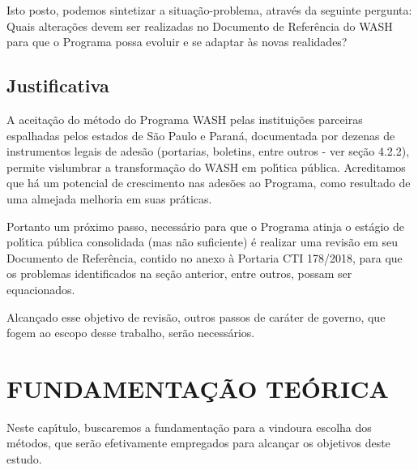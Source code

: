 \documentclass[
12pt,		%
openright,	%
twoside,  %
a4paper,			%
chapter=TITLE,		%
english,			%
french,				%
spanish,			%
brazil				%
]{USPSC-classe/USPSC}
\begin{document}
Isto posto, podemos sintetizar a situa\c{c}\~ao-problema, atrav\'es da seguinte pergunta: \textquotedbl Quais altera\c{c}\~oes devem ser realizadas no Documento de Refer\^encia do WASH para que o Programa possa evoluir e se adaptar \`as novas realidades?\textquotedbl 








\section[Justificativa]{Justificativa}\label{Justificativa}
A aceita\c{c}\~ao do m\'etodo do Programa WASH pelas institui\c{c}\~oes parceiras espalhadas pelos estados de S\~ao Paulo e Paran\'a, documentada por dezenas de instrumentos legais de ades\~ao (portarias, boletins, entre outros - ver se\c{c}\~ao 4.2.2), permite vislumbrar a transforma\c{c}\~ao do WASH em pol\'{\i}tica p\'ublica. Acreditamos que h\'a um potencial de crescimento nas ades\~oes ao Programa, como resultado de uma almejada melhoria em suas pr\'aticas.








Portanto um pr\'oximo passo, necess\'ario para que o Programa atinja o est\'agio de pol\'{\i}tica p\'ublica consolidada (mas n\~ao suficiente) \'e realizar uma revis\~ao em seu Documento de Refer\^encia, contido no anexo \`a Portaria CTI 178/2018, para que os problemas identificados na se\c{c}\~ao anterior, entre outros, possam ser equacionados.








Alcan\c{c}ado esse objetivo de revis\~ao, outros passos de car\'ater de governo, que fogem ao escopo desse trabalho, ser\~ao necess\'arios.








\chapter[FUNDAMENTA\c{C}\~AO TE\'ORICA ]{FUNDAMENTA\c{C}\~AO TE\'ORICA }\label{FUNDAMENTA\c{C}\~AO TE\'ORICA }
Neste cap\'{\i}tulo, buscaremos a fundamenta\c{c}\~ao para a vindoura escolha dos m\'etodos, que ser\~ao efetivamente empregados para alcan\c{c}ar os objetivos deste estudo.
\end{document}
